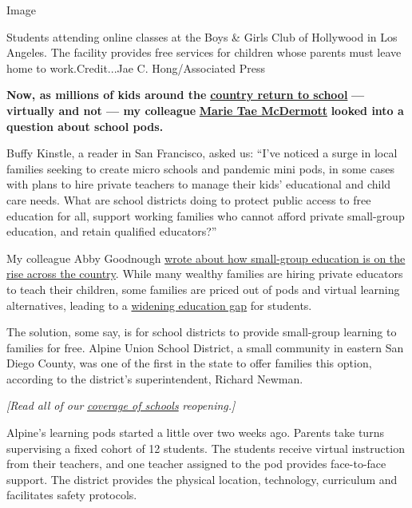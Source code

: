Image

Students attending online classes at the Boys \& Girls Club of Hollywood
in Los Angeles. The facility provides free services for children whose
parents must leave home to work.Credit...Jae C. Hong/Associated Press

\textbf{Now, as millions of kids around the}
\textbf{\href{https://www.nytimes3xbfgragh.onion/spotlight/schools-reopening?}{country
return to school}} \textbf{--- virtually and not --- my colleague}
\textbf{\href{https://www.nytimes3xbfgragh.onion/by/marie-tae-mcdermott}{Marie
Tae McDermott}} \textbf{looked into a question about school pods.}

Buffy Kinstle, a reader in San Francisco, asked us: ``I've noticed a
surge in local families seeking to create micro schools and pandemic
mini pods, in some cases with plans to hire private teachers to manage
their kids' educational and child care needs. What are school districts
doing to protect public access to free education for all, support
working families who cannot afford private small-group education, and
retain qualified educators?''

My colleague Abby Goodnough
\href{https://www.nytimes3xbfgragh.onion/2020/08/14/us/covid-schools-learning-pods.html}{wrote
about how small-group education is on the rise across the country}.
While many wealthy families are hiring private educators to teach their
children, some families are priced out of pods and virtual learning
alternatives, leading to a
\href{https://www.nytimes3xbfgragh.onion/2020/06/05/us/coronavirus-education-lost-learning.html}{widening
education gap} for students.

The solution, some say, is for school districts to provide small-group
learning to families for free. Alpine Union School District, a small
community in eastern San Diego County, was one of the first in the state
to offer families this option, according to the district's
superintendent, Richard Newman.

\emph{{[}Read all of our}
\href{https://www.nytimes3xbfgragh.onion/spotlight/schools-reopening?}{\emph{coverage
of schools}} \emph{reopening.{]}}

Alpine's learning pods started a little over two weeks ago. Parents take
turns supervising a fixed cohort of 12 students. The students receive
virtual instruction from their teachers, and one teacher assigned to the
pod provides face-to-face support. The district provides the physical
location, technology, curriculum and facilitates safety protocols.

